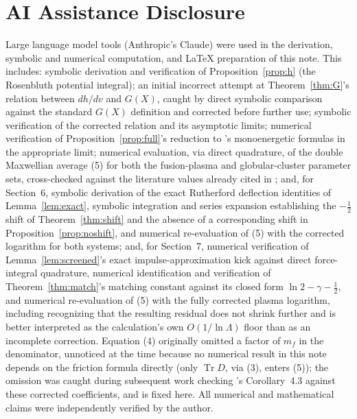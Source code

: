 \documentclass[12pt]{amsart}
\theoremstyle{plain}
\theoremstyle{remark}
\begin{document}
\section*{AI Assistance Disclosure}

Large language model tools (Anthropic's Claude) were used in the derivation, symbolic and numerical computation, and \LaTeX{} preparation of this note. This includes: symbolic derivation and verification of Proposition~\ref{prop:h} (the Rosenbluth potential integral); an initial incorrect attempt at Theorem~\ref{thm:G}'s relation between $dh/dv$ and $G(X)$, caught by direct symbolic comparison against the standard $G(X)$ definition and corrected before further use; symbolic verification of the corrected relation and its asymptotic limits; numerical verification of Proposition~\ref{prop:full}'s reduction to \cite{Ebert2026Bath}'s monoenergetic formulas in the appropriate limit; numerical evaluation, via direct quadrature, of the double Maxwellian average (5) for both the fusion-plasma and globular-cluster parameter sets, cross-checked against the literature values already cited in \cite{Ebert2026Fusion,Ebert2026Cluster}; and, for Section~6, symbolic derivation of the exact Rutherford deflection identities of Lemma~\ref{lem:exact}, symbolic integration and series expansion establishing the $-\tfrac12$ shift of Theorem~\ref{thm:shift} and the absence of a corresponding shift in Proposition~\ref{prop:noshift}, and numerical re-evaluation of (5) with the corrected logarithm for both systems; and, for Section~7, numerical verification of Lemma~\ref{lem:screened}'s exact impulse-approximation kick against direct force-integral quadrature, numerical identification and verification of Theorem~\ref{thm:match}'s matching constant against its closed form $\ln2-\gamma-\tfrac12$, and numerical re-evaluation of (5) with the fully corrected plasma logarithm, including recognizing that the resulting residual does not shrink further and is better interpreted as the calculation's own $O(1/\ln\Lambda)$ floor than as an incomplete correction. Equation (4) originally omitted a factor of $m_f$ in the denominator, unnoticed at the time because no numerical result in this note depends on the friction formula directly (only $\operatorname{Tr}D$, via (3), enters (5)); the omission was caught during subsequent work checking \cite{Ebert2026Bath}'s Corollary~4.3 against these corrected coefficients, and is fixed here. All numerical and mathematical claims were independently verified by the author.
\end{document}
